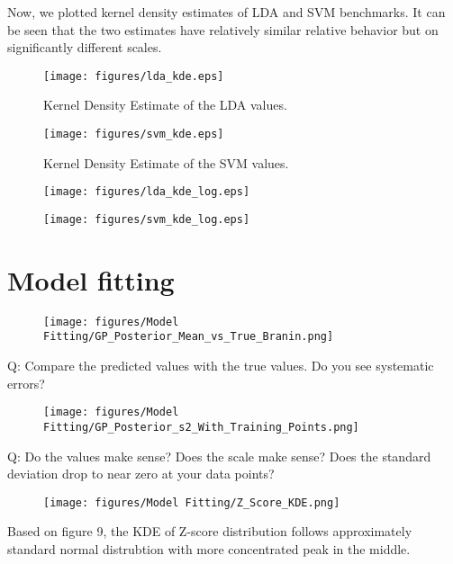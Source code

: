 \documentclass[11pt]{article}
\numberwithin{equation}{section}
\begin{document}
Now, we plotted kernel density estimates of LDA and SVM benchmarks. It can be seen that the two estimates have relatively similar relative
behavior but on significantly different scales.
\begin{figure}[H]
  \centering
  \texttt{[image: figures/lda\_kde.eps]}
  \caption{Kernel Density Estimate of the LDA values.}
  \label{fig:lda_kde}
\end{figure}
\begin{figure}[H]
  \centering
  \texttt{[image: figures/svm\_kde.eps]}
  \caption{Kernel Density Estimate of the SVM values.}
  \label{fig:svm_kde}
\end{figure}



\begin{figure}[H]
  \centering
  \texttt{[image: figures/lda\_kde\_log.eps]}
  \caption{}
  \label{}
\end{figure}
\begin{figure}[H]
  \centering
  \texttt{[image: figures/svm\_kde\_log.eps]}
  \caption{}
  \label{}
\end{figure}

\section*{Model fitting}

\begin{figure}[H]
  \centering
  \texttt{[image: figures/Model Fitting/GP\_Posterior\_Mean\_vs\_True\_Branin.png]}
  \caption{}
  \label{}
\end{figure}
Q: Compare
the predicted values with the true values. Do you see systematic errors?

\begin{figure}[H]
  \centering
  \texttt{[image: figures/Model Fitting/GP\_Posterior\_s2\_With\_Training\_Points.png]}
  \caption{}
  \label{}
\end{figure}
Q: Do the values make sense? Does the scale make sense? Does the standard
deviation drop to near zero at your data points?

\begin{figure}[H]
  \centering
  \texttt{[image: figures/Model Fitting/Z\_Score\_KDE.png]}
  \caption{}
  \label{}
\end{figure}
Based on figure 9, the KDE of Z-score distribution follows approximately standard normal distrubtion with more concentrated peak in the middle.
\end{document}
